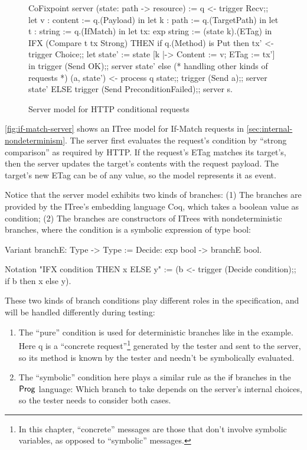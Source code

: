 \begin{figure}
\begin{coq}
  CoFixpoint server (state: path -> resource) :=
    q <- trigger Recv;;
    let v : content    := q.(Payload)      in
    let k : path       := q.(TargetPath)   in
    let t : string     := q.(IfMatch)      in
    let tx: exp string := (state k).(ETag) in
    IFX (Compare t tx Strong)
    THEN
      if q.(Method) is Put
      then
        tx' <- trigger Choice;;
        let state' := state [k |-> {Content := v; ETag := tx'}] in
        trigger (Send OK);;
        server state'
      else                 (* handling other kinds of requests *)
        (a, state') <- process q state;;
        trigger (Send a);;
        server state'
    ELSE
      trigger (Send PreconditionFailed);;
      server s.
\end{coq}
\caption{Server model for HTTP conditional requests}
\label{fig:if-match-server}
\end{figure}

\autoref{fig:if-match-server} shows an ITree model for If-Match requests in
\autoref{sec:internal-nondeterminism}.  The server first evaluates the request's
 condition by ``strong comparison'' as required by HTTP.  If
the request's ETag matches its target's, then the server updates the target's
contents with the request payload.  The target's new ETag  can be of
any value, so the model represents it as  event.

Notice that the server model exhibits two kinds of branches: (1) The 
branches are provided by the ITree's embedding language Coq, which takes a
boolean value as condition; (2) The  branches are constructors of
ITrees with nondeterministic branches, where the condition is a symbolic
expression of type bool:
\begin{coq}
  Variant branchE: Type -> Type :=
    Decide: exp bool -> branchE bool.

  Notation "IFX condition THEN x ELSE y" :=
    (b <- trigger (Decide condition);;
     if b then x else y).
\end{coq}

These two kinds of branch conditions play different roles in the specification,
and will be handled differently during testing:
\begin{enumerate}
\item The ``pure''  condition is used for deterministic branches like
   in the example.  Here \ilc q is a ``concrete
  request''\footnote{In this chapter, ``concrete'' messages are those that don't
    involve symbolic variables, as opposed to ``symbolic'' messages.} generated
  by the tester and sent to the server, so its method is known by the tester and
  needn't be symbolically evaluated.
\item The ``symbolic''  condition here plays a similar rule as the
  $\mathsf{if}$ branches in the $\mathsf{Prog}$ language: Which branch to take depends
  on the server's internal choices, so the tester needs to consider both cases.
\end{enumerate}

